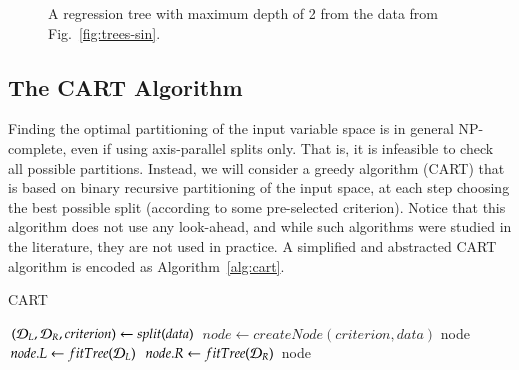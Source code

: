 \begin{refsection}
\begin{figure}[htbp]
\label{fig:fig:trees-sin-2}
\caption{A regression tree with maximum depth of 2 from the data from Fig.~\ref{fig:trees-sin}.}
\end{figure}

\subsection*{The CART Algorithm}

Finding the optimal partitioning of the input variable space is in general NP-complete, even if using axis-parallel splits only. That is, it is infeasible to check all possible partitions. Instead, we will consider a greedy algorithm (CART) that is based on binary recursive partitioning of the input space, at each step choosing the best possible split (according to some pre-selected criterion). Notice that this algorithm does not use any look-ahead, and while such algorithms were studied in the literature, they are not used in practice. A simplified and abstracted CART algorithm is encoded as Algorithm~\ref{alg:cart}.

\begin{algorithm}
\caption{CART}\label{alg:cart}
\begin{algorithmic}[1]
\State $(\mathcal{D}_L, \mathcal{D}_R, criterion) \gets split(data)$
\State $node \gets createNode(criterion, data)$
 \Return node \EndIf
\State $node.L \gets fitTree(\mathcal{D}_L)$
\State $node.R \gets fitTree(\mathcal{D}_R)$
\State \Return node
\EndProcedure
\end{algorithmic}
\end{algorithm}


\end{refsection}
